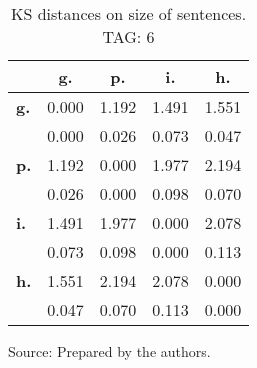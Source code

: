 \begin{table}[h!]
\begin{center}
\caption{KS distances on size of sentences. TAG: 6}
\begin{tabular}{| l || c | c | c | c |}\hline
 & {\bf g.} & {\bf p.} & {\bf i.} & {\bf h.} \\\hline\hline
{\bf g.} & 0.000 & 1.192 & 1.491 & 1.551 \\
{\bf } & 0.000 & 0.026 & 0.073 & 0.047 \\\hline
{\bf p.} & 1.192 & 0.000 & 1.977 & 2.194 \\
{\bf } & 0.026 & 0.000 & 0.098 & 0.070 \\\hline
{\bf i.} & 1.491 & 1.977 & 0.000 & 2.078 \\
{\bf } & 0.073 & 0.098 & 0.000 & 0.113 \\\hline
{\bf h.} & 1.551 & 2.194 & 2.078 & 0.000 \\
{\bf } & 0.047 & 0.070 & 0.113 & 0.000 \\\hline
\end{tabular}
\begin{flushleft}
		Source: Prepared by the authors.\
\end{flushleft}
\end{center}
\end{table}
